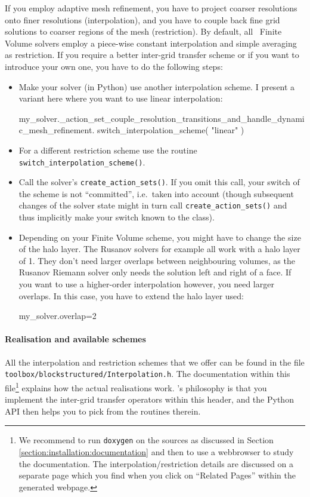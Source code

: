 If you employ adaptive mesh refinement, you have to project coarser resolutions
onto finer resolutions (interpolation), and you have to couple back fine grid
solutions to coarser regions of the mesh (restriction).
By default, all \ExaHyPE\ Finite Volume solvers employ a piece-wise constant
interpolation and simple averaging as restriction.
If you require a better inter-grid transfer scheme or if you want to introduce your own one, you have to do the following steps:

\begin{itemize}
  \item Make your solver (in Python) use another interpolation scheme. I present
  a variant here where you want to use linear interpolation:
  \begin{code}
my_solver._action_set_couple_resolution_transitions_and_handle_dynamic_mesh_refinement.
  switch_interpolation_scheme( "linear" )
  \end{code}
  \item For a different restriction scheme use the routine
  \texttt{switch\_interpolation\_scheme()}.
  \item Call the solver's \texttt{create\_action\_sets()}. If you omit this
  call, your switch of the scheme is not ``committed'', i.e.~taken into account
  (though subsequent changes of the solver state might in turn call
  \texttt{create\_action\_sets()} and thus implicitly make your switch known to
  the class).
  \item Depending on your Finite Volume scheme, you might have to change the
  size of the halo layer. The Rusanov solvers for example all work with a halo
  layer of 1. They don't need larger overlaps between neighbouring volumes, as
  the Rusanov Riemann solver only needs the solution left and right of a face.
  If you want to use a higher-order interpolation however, you need larger
  overlaps. In this case, you have to extend the halo layer used:
  \begin{code}
my_solver.overlap=2
  \end{code}
\end{itemize}


\paragraph{Realisation and available schemes}
%
%
All the interpolation and restriction schemes that we offer can be found in the
file \texttt{toolbox/blockstructured/Interpolation.h}.
The documentation within this file\footnote{We recommend to run
\texttt{doxygen} on the sources as discussed in Section
\ref{section:installation:documentation} and then to use a webbrowser to study
the documentation. The interpolation/restriction details are discussed on a 
separate page which you find when you click on ``Related Pages'' within the
generated webpage.} explains how the actual realisations work.
\ExaHyPE's philosophy is that you implement the inter-grid transfer operators
within this header, and the Python API then helps you to pick from the routines
therein.

